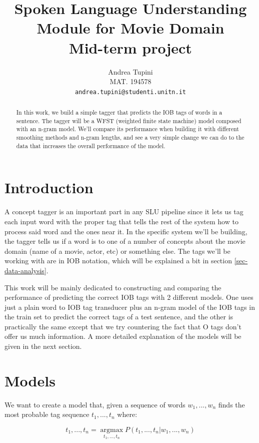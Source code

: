 \documentclass[11pt,a4paper]{article}
\title{Spoken Language Understanding Module for Movie Domain \\ Mid-term project}
\author{Andrea Tupini \\
  MAT.  194578 \\
  {\tt andrea.tupini@studenti.unitn.it}}
\date{}
\begin{document}
	
\maketitle

\begin{abstract}
	
	In this work, we build a simple tagger that predicts the IOB tags of words in a sentence. The tagger will be a WFST (weighted finite state machine) model composed with an n-gram model. We'll compare its performance when building it with different smoothing methods and n-gram lengths, and see a very simple change we can do to the data that increases the overall performance of the model. 
	\\
	
\end{abstract}

\section{Introduction}

	A concept tagger is an important part in any SLU pipeline since it lets us tag each input word with the proper tag that tells the rest of the system how to process said word and the ones near it. In the specific system we'll be building, the tagger tells us if a word is to one of a number of concepts about the movie domain (name of a movie, actor, etc) or something else. The tags we'll be working with are in IOB notation, which will be explained a bit in section \ref{sec-data-analysis}. 
	
	This work will be mainly dedicated to constructing and comparing the performance of predicting the correct IOB tags with 2 different models. One uses just a plain word to IOB tag transducer plus an n-gram model of the IOB tags in the train set to predict the correct tags of a test sentence, and the other is practically the same except that we try countering the fact that O tags don't offer us much information. A more detailed explanation of the models will be given in the next section.
	

\section{Models}

	We want to create a model that, given a sequence of words $w_1, ... , w_n$ finds the most probable tag sequence $t_1, ... , t_n$ where:
	
	$$
	t_1, ... , t_n = \operatorname*{argmax}_{t_1,...,t_n} P(t_1,...,t_n | w_1,...,w_n)
	$$
	
\end{document}
